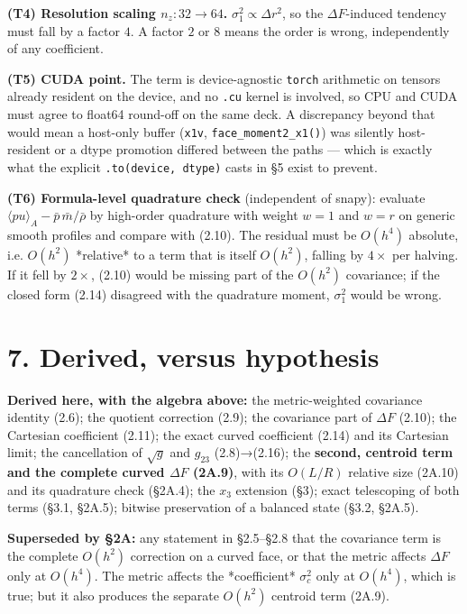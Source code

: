 \documentclass[11pt,a4paper]{article}
\begin{document}
\textbf{(T4) Resolution scaling $n_z: 32\to64$.} $\sigma_1^2\propto\Delta r^2$, so the
$\Delta F$-induced tendency must fall by a factor $4$. A factor $2$ or $8$ means
the order is wrong, independently of any coefficient.

\textbf{(T5) CUDA point.} The term is device-agnostic \texttt{torch} arithmetic on tensors
already resident on the device, and no \texttt{.cu} kernel is involved, so CPU and CUDA
must agree to float64 round-off on the same deck. A discrepancy beyond that
would mean a host-only buffer (\texttt{x1v}, \texttt{face\_moment2\_x1()}) was silently
host-resident or a dtype promotion differed between the paths — which is exactly
what the explicit \texttt{.to(device, dtype)} casts in §5 exist to prevent.

\textbf{(T6) Formula-level quadrature check} (independent of snapy):
evaluate $\langle pu\rangle_A-\bar p\,\bar m/\bar\rho$ by high-order quadrature
with weight $w=1$ and $w=r$ on generic smooth profiles and compare with (2.10).
The residual must be $O(h^4)$ absolute, i.e. $O(h^2)$ *relative* to a term that
is itself $O(h^2)$, falling by $4\times$ per halving. If it fell by $2\times$,
(2.10) would be missing part of the $O(h^2)$ covariance; if the closed form
(2.14) disagreed with the quadrature moment, $\sigma_1^2$ would be wrong.

\hrulefill

\section*{7. Derived, versus hypothesis}

\textbf{Derived here, with the algebra above:} the metric-weighted covariance identity
(2.6); the quotient correction (2.9); the covariance part of $\Delta F$ (2.10);
the Cartesian coefficient (2.11); the exact curved coefficient (2.14) and its
Cartesian limit; the cancellation of $\sqrt{g}$ and $g_{23}$ (2.8)→(2.16); the
\textbf{second, centroid term and the complete curved $\Delta F$ (2A.9)}, with its
$O(L/R)$ relative size (2A.10) and its quadrature check (§2A.4); the $x_3$
extension (§3); exact telescoping of both terms (§3.1, §2A.5); bitwise
preservation of a balanced state (§3.2, §2A.5).

\textbf{Superseded by §2A:} any statement in §2.5–§2.8 that the covariance term is the
complete $O(h^2)$ correction on a curved face, or that the metric affects
$\Delta F$ only at $O(h^4)$. The metric affects the *coefficient* $\sigma_c^2$
only at $O(h^4)$, which is true; but it also produces the separate $O(h^2)$
centroid term (2A.9).
\end{document}
